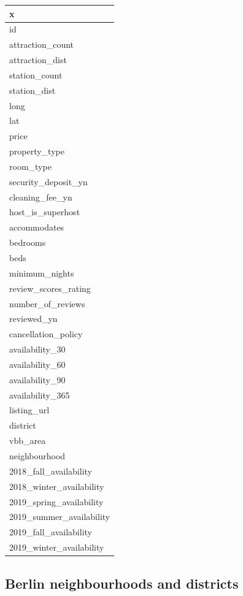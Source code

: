 \begin{table}[H]
\centering
\begin{tabular}{l}
  \hline
x \\ 
  \hline
id \\ 
  attraction\_count \\ 
  attraction\_dist \\ 
  station\_count \\ 
  station\_dist \\ 
  long \\ 
  lat \\ 
  price \\ 
  property\_type \\ 
  room\_type \\ 
  security\_deposit\_yn \\ 
  cleaning\_fee\_yn \\ 
  host\_is\_superhost \\ 
  accommodates \\ 
  bedrooms \\ 
  beds \\ 
  minimum\_nights \\ 
  review\_scores\_rating \\ 
  number\_of\_reviews \\ 
  reviewed\_yn \\ 
  cancellation\_policy \\ 
  availability\_30 \\ 
  availability\_60 \\ 
  availability\_90 \\ 
  availability\_365 \\ 
  listing\_url \\ 
  district \\ 
  vbb\_area \\ 
  neighbourhood \\ 
  2018\_fall\_availability \\ 
  2018\_winter\_availability \\ 
  2019\_spring\_availability \\ 
  2019\_summer\_availability \\ 
  2019\_fall\_availability \\ 
  2019\_winter\_availability \\ 
   \hline
\end{tabular}
\end{table}

\fi

\subsection{Berlin neighbourhoods and districts}


